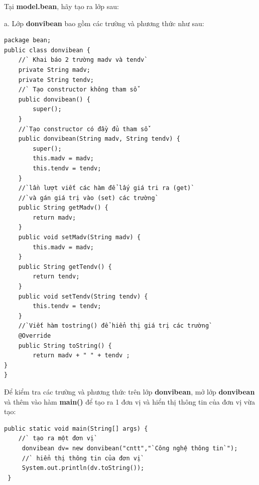 Tại \textbf{model.bean}, hãy tạo ra lớp sau:

a. Lớp \textbf{donvibean} bao gồm các trường và phương thức như sau:

\begin{lstlisting}[escapechar=`]
package bean;
public class donvibean {
	//` Khai báo 2 trường madv và tendv`
	private String madv;
	private String tendv;
	//` Tạo constructor không tham số`
	public donvibean() {
		super();
	}
	//`Tạo constructor có đầy đủ tham số`
	public donvibean(String madv, String tendv) {
		super();
		this.madv = madv;
		this.tendv = tendv;
	}
	//`lần lượt viết các hàm để lấy giá tri ra (get)`
	//`và gán giá trị vào (set) các trường`
	public String getMadv() {
		return madv;
	}
	public void setMadv(String madv) {
		this.madv = madv;
	}
	public String getTendv() {
		return tendv;
	}
	public void setTendv(String tendv) {
		this.tendv = tendv;
	}
	//`Viết hàm tostring() để hiển thị giá trị các trường`
	@Override
	public String toString() {
		return madv + " " + tendv ;
}
}
\end{lstlisting}

Để kiểm tra các trường và phương thức trên lớp \textbf{donvibean}, mở lớp \textbf{donvibean} và thêm vào hàm \textbf{main()} để tạo ra 1 đơn vị và hiển thị thông tin của đơn vị vừa tạo:

\begin{lstlisting}[escapechar=`]
 public static void main(String[] args) {
 	//` tạo ra một đơn vị`
 	 donvibean dv= new donvibean("cntt","`Công nghệ thông tin`");
 	 //` hiển thị thông tin của đơn vị`
	 System.out.println(dv.toString());
 }
\end{lstlisting}

